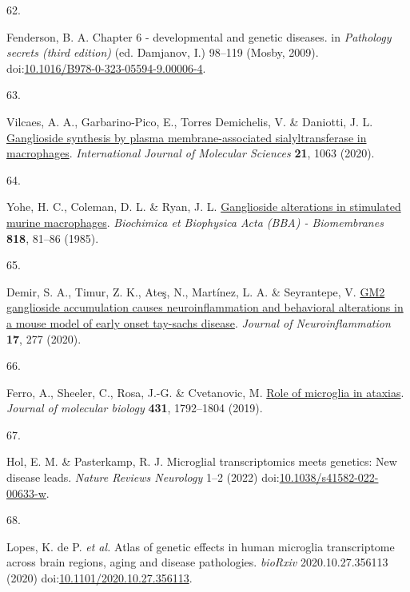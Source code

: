 \documentclass[
]{article}
\newlength{\cslhangindent}
\newlength{\csllabelwidth}
\newenvironment{CSLReferences}[2] %
 {\begin{list}{}{%
  \setlength{\itemindent}{0pt}
  \setlength{\leftmargin}{0pt}
  \setlength{\parsep}{0pt}
  \ifodd #1
   \setlength{\leftmargin}{\cslhangindent}
   \setlength{\itemindent}{-1\cslhangindent}
  \fi
  \setlength{\itemsep}{#2\baselineskip}}}
 {\end{list}}
\newcommand{\CSLLeftMargin}[1]{\parbox[t]{\csllabelwidth}{\strut#1\strut}}
\newcommand{\CSLRightInline}[1]{\parbox[t]{\linewidth - \csllabelwidth}{\strut#1\strut}}
\begin{document}
\begin{CSLReferences}{0}{0}
\CSLLeftMargin{62. }%
\CSLRightInline{Fenderson, B. A. Chapter 6 - developmental and genetic
diseases. in \emph{Pathology secrets (third edition)} (ed. Damjanov, I.)
98--119 (Mosby, 2009).
doi:\href{https://doi.org/10.1016/B978-0-323-05594-9.00006-4}{10.1016/B978-0-323-05594-9.00006-4}.}

\CSLLeftMargin{63. }%
\CSLRightInline{Vilcaes, A. A., Garbarino-Pico, E., Torres Demichelis,
V. \& Daniotti, J. L.
\href{https://doi.org/10.3390/ijms21031063}{Ganglioside synthesis by
plasma membrane-associated sialyltransferase in macrophages}.
\emph{International Journal of Molecular Sciences} \textbf{21}, 1063
(2020).}

\CSLLeftMargin{64. }%
\CSLRightInline{Yohe, H. C., Coleman, D. L. \& Ryan, J. L.
\href{https://doi.org/10.1016/0005-2736(85)90141-5}{Ganglioside
alterations in stimulated murine macrophages}. \emph{Biochimica et
Biophysica Acta (BBA) - Biomembranes} \textbf{818}, 81--86 (1985).}

\CSLLeftMargin{65. }%
\CSLRightInline{Demir, S. A., Timur, Z. K., Ateş, N., Martínez, L. A. \&
Seyrantepe, V. \href{https://doi.org/10.1186/s12974-020-01947-6}{GM2
ganglioside accumulation causes neuroinflammation and behavioral
alterations in a mouse model of early onset tay-sachs disease}.
\emph{Journal of Neuroinflammation} \textbf{17}, 277 (2020).}

\CSLLeftMargin{66. }%
\CSLRightInline{Ferro, A., Sheeler, C., Rosa, J.-G. \& Cvetanovic, M.
\href{https://doi.org/10.1016/j.jmb.2019.01.016}{Role of microglia in
ataxias}. \emph{Journal of molecular biology} \textbf{431}, 1792--1804
(2019).}

\CSLLeftMargin{67. }%
\CSLRightInline{Hol, E. M. \& Pasterkamp, R. J. Microglial
transcriptomics meets genetics: New disease leads. \emph{Nature Reviews
Neurology} 1--2 (2022)
doi:\href{https://doi.org/10.1038/s41582-022-00633-w}{10.1038/s41582-022-00633-w}.}

\CSLLeftMargin{68. }%
\CSLRightInline{Lopes, K. de P. \emph{et al.} Atlas of genetic effects
in human microglia transcriptome across brain regions, aging and disease
pathologies. \emph{bioRxiv} 2020.10.27.356113 (2020)
doi:\href{https://doi.org/10.1101/2020.10.27.356113}{10.1101/2020.10.27.356113}.}


\end{CSLReferences}
\end{document}
